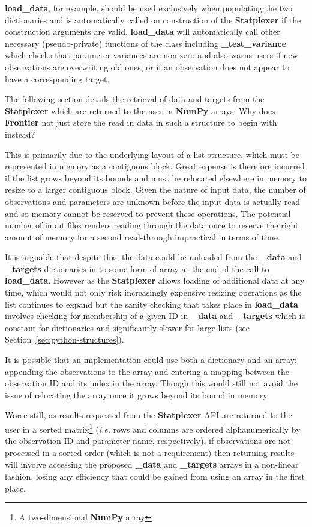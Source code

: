 \textbf{load\_data}, for example, should be used exclusively when populating
the two dictionaries and is automatically called on construction of the
\textbf{Statplexer} if the construction arguments are valid.
\textbf{load\_data} will automatically call other necessary (pseudo-private)
functions of the class including \textbf{\_test\_variance} which checks that
parameter variances are non-zero and also warns users if new observations
are overwriting old ones, or if an observation does not appear to have a
corresponding target.

The following section details the retrieval of data and targets from the
\textbf{Statplexer} which are returned to the user in \textbf{NumPy} arrays. Why
does \textbf{Frontier} not just store the read in data in such a structure to
begin with instead?

This is primarily due to the underlying layout of a list structure, which must
be represented in memory as a contiguous block. Great expense is therefore
incurred if the list grows beyond its bounds and must be relocated elsewhere in
memory to resize to a larger contiguous block. Given the nature of input data,
the number of observations and parameters are unknown before the input
data is actually read and so memory cannot be reserved to prevent these operations.
The potential number of input files renders reading through the data once to
reserve the right amount of memory for a second read-through impractical in
terms of time.

It is arguable that despite this, the data could be unloaded from the
\textbf{\_data} and \textbf{\_targets} dictionaries in to some form of array at
the end of the call to \textbf{load\_data}. However as the \textbf{Statplexer}
allows loading of additional data at any time, which would not only risk
increasingly expensive resizing operations as the list continues to expand but
the sanity checking that takes place in \textbf{load\_data} involves checking
for membership of a given ID in \textbf{\_data} and \textbf{\_targets} which is
constant for dictionaries and significantly slower for large lists (see
Section~\ref{sec:python-structures}).

It is possible that an implementation could use both a dictionary and an array;
appending the observations to the array and entering a mapping between the
observation ID and its index in the array.  Though this would still not avoid
the issue of relocating the array once it grows beyond its bound in memory.

Worse still, as results requested from the \textbf{Statplexer} API are returned
to the user in a sorted matrix\footnote{A two-dimensional \textbf{NumPy} array}
(\textit{i.e.} rows and columns are ordered alphanumerically by the observation
ID and parameter name, respectively), if observations are not processed in a
sorted order (which is not a requirement) then returning results will involve
accessing the proposed \textbf{\_data} and \textbf{\_targets} arrays in a
non-linear fashion, losing any efficiency that could be gained from using an
array in the first place.

